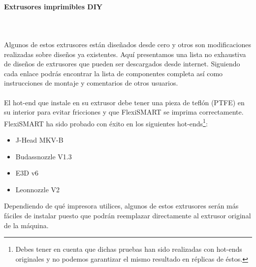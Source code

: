 \documentclass[11pt,a4paper]{article}
\begin{document}
			\paragraph{Extrusores imprimibles DIY}\mbox{}\\\\
Algunos de estos extrusores están diseñados desde cero y otros son modificaciones realizadas sobre diseños ya existentes. Aquí presentamos una lista no exhaustiva de diseños de extrusores que pueden ser descargados desde internet. Siguiendo cada enlace podrás encontrar la lista de componentes completa así como instrucciones de montaje y comentarios de otros usuarios.
\\\\
El hot-end que instale en su extrusor debe tener una pieza de teflón (PTFE) en su interior para evitar fricciones y que FlexiSMART se imprima correctamente. FlexiSMART ha sido probado con éxito en los siguientes hot-ends\footnote{Debes tener en cuenta que dichas pruebas han sido realizadas con hot-ends originales y no podemos garantizar el mismo resultado en réplicas de éstos.}:
\begin{itemize}
\item J-Head MKV-B
\item Budassnozzle V1.3
\item E3D v6
\item Leonnozzle V2
\end{itemize}
Dependiendo de qué impresora utilices, algunos de estos extrusores serán más fáciles de instalar puesto que podrán reemplazar directamente al extrusor original de la máquina.
\end{document}
